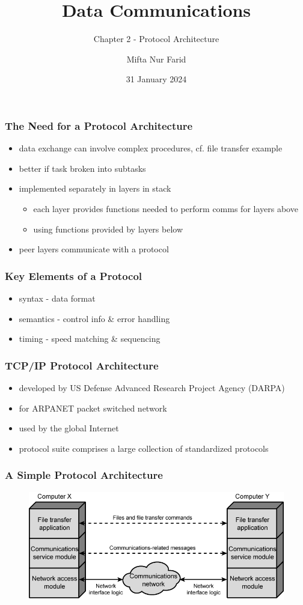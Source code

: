 \documentclass[pdflatex,compress]{beamer}
\title{Data Communications}
\subtitle{Chapter 2 - Protocol Architecture}
\author{Mifta Nur Farid}
\date{31 January 2024}
\begin{document}
\maketitle

\begin{frame}
	\frametitle{The Need for a Protocol Architecture}
	\begin{itemize}
		\item data exchange can involve complex
		procedures, cf. file transfer example
		\item better if task broken into subtasks
		\item implemented separately in layers in stack
		\begin{itemize}
			\item each layer provides functions needed to
			perform comms for layers above
			\item using functions provided by layers below
		\end{itemize}
		\item peer layers communicate with a protocol
	\end{itemize}
\end{frame}

\begin{frame}
	\frametitle{Key Elements of a Protocol}
	\begin{itemize}
		\item syntax - data format
		\item semantics - control info \& error handling
		\item timing - speed matching \& sequencing
	\end{itemize}
\end{frame}

\begin{frame}
	\frametitle{TCP/IP Protocol Architecture}
	\begin{itemize}
		\item developed by US Defense Advanced Research Project Agency (DARPA)
		\item for ARPANET packet switched network
		\item used by the global Internet
		\item protocol suite comprises a large collection of standardized protocols
	\end{itemize}
\end{frame}

\begin{frame}
	\frametitle{A Simple Protocol Architecture}
	\begin{figure}
		\centering
		\includegraphics[width=\linewidth]{img/img01}
	\end{figure}
\end{frame}
\end{document}
